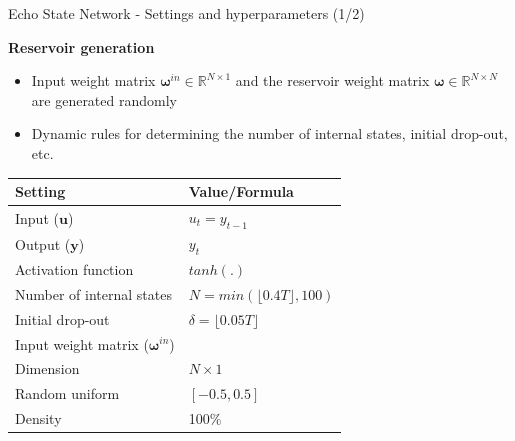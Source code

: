 \documentclass[aspectratio=169]{beamer}
\begin{document}
\begin{frame}[t]{Echo State Network  - Settings and hyperparameters (1/2)}
    \begin{minipage}[t]{0.3\textwidth}
        \vspace{0pt}
        \textbf{Reservoir generation}
        \begin{itemize}
        	\item Input weight matrix $\boldsymbol{\omega}^{in} \in \mathbb{R}^{N \times 1}$ and the reservoir weight matrix $\boldsymbol{\omega} \in \mathbb{R}^{N \times N}$ are generated randomly
        	\item Dynamic rules for determining the number of internal states, initial drop-out, etc.
        \end{itemize}
    \end{minipage}%
    \hfill
    \begin{minipage}[t]{0.7\textwidth}
        \vspace{0pt}
        	\begin{table}[ht]
        	\scriptsize
			\centering
				\begin{tabular}{ll}
				\toprule
				\textbf{Setting}                                    & \textbf{Value/Formula}               \\
				\midrule
				Input ($\mathbf{u}$)                                & $u_t = y_{t-1}$                            \\
				Output ($\mathbf{y}$)                               & $y_{t}$                              \\
				Activation function                                 & $tanh(.)$                            \\
				Number of internal states                           & $N = min(\lfloor 0.4T \rfloor, 100)$ \\
				Initial drop-out                                    & $\delta = \lfloor 0.05T \rfloor$     \\
				\midrule
				Input weight matrix ($\boldsymbol{\omega}^{in}$)    &                                      \\
				\hspace{2.5mm} Dimension                            & $N \times 1$                         \\
				\hspace{2.5mm} Random uniform                       & $[-0.5, 0.5]$                        \\
				\hspace{2.5mm} Density                              & 100\%                                \\

\end{tabular}
\end{table}
\end{minipage}
\end{frame}
\end{document}
